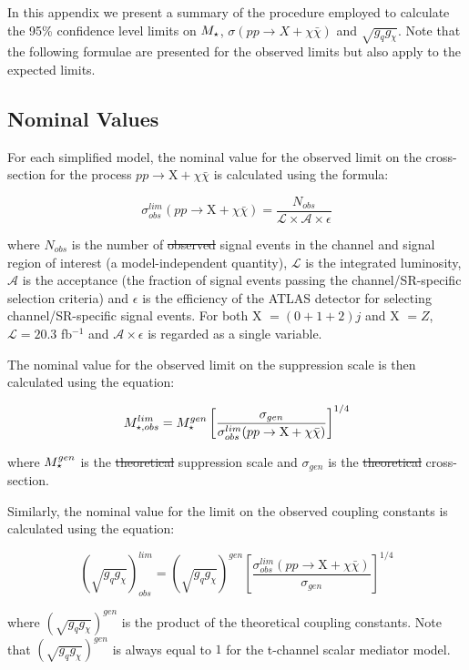 \begin{flushleft}
In this appendix we present a summary of the procedure employed to calculate the 95\% confidence level limits on $M_{\star}$, \st{$\sigma(pp \rightarrow X + \chi\bar{\chi})$} and $\sqrt{g_{q}g_{\chi}}$. Note that the following formulae are presented for the observed limits but also apply to the expected limits.
\end{flushleft}

\subsection{Nominal Values}
\begin{flushleft}
For each simplified model, the nominal value for the observed limit on the cross-section for the process $pp \rightarrow \mathrm{X} + \chi\bar{\chi}$ is calculated using the formula:

\begin{equation}
\label{sigma_nom}
\sigma_{obs}^{lim}(pp \rightarrow \mathrm{X} + \chi\bar{\chi}) = \frac{N_{obs}}{\mathcal{L}\times\mathcal{A}\times\epsilon}
\end{equation}

where $N_{obs}$ is  the number of \st{observed} signal events in the channel and signal region of interest (a model-independent quantity), $\mathcal{L}$ is the integrated luminosity, $\mathcal{A}$ is the acceptance (the fraction of signal events passing the channel/SR-specific selection criteria) and $\epsilon$ is the efficiency of the ATLAS detector for selecting channel/SR-specific signal events. For both X $= (0 + 1 + 2)j$ and X $=Z$, $\mathcal{L}=20.3$ fb$^{-1}$ and $\mathcal{A}\times\epsilon$ is regarded as a single variable.
\bigskip

The nominal value for the observed limit on the suppression scale is then calculated using the equation:

\begin{equation}
\label{M_*_nom}
M_{\star, obs}^{lim} = M_{\star}^{gen}\left[\frac{\sigma_{gen}}{\sigma_{obs}^{lim}(pp \rightarrow \mathrm{X} + \chi\bar{\chi})}\right]^{1/4}
\end{equation}

where $M_{\star}^{gen}$ is the \st{theoretical}  suppression scale and $\sigma_{gen}$ is the \st{theoretical}  cross-section.
\bigskip

Similarly, the nominal value for the limit on the observed coupling constants is calculated using the equation:

\begin{equation}
\label{coupling_nom}
(\sqrt{g_{q}g_{\chi}})_{obs}^{lim} = (\sqrt{g_{q}g_{\chi}})^{gen}\left[\frac{\sigma_{obs}^{lim}(pp \rightarrow \mathrm{X} + \chi\bar{\chi})}{\sigma_{gen}}\right]^{1/4}
\end{equation}

where $(\sqrt{g_{q}g_{\chi}})^{gen}$ is the product of the theoretical coupling constants. Note that $(\sqrt{g_{q}g_{\chi}})^{gen}$ is always equal to $1$ for the t-channel scalar mediator model.
\end{flushleft}


